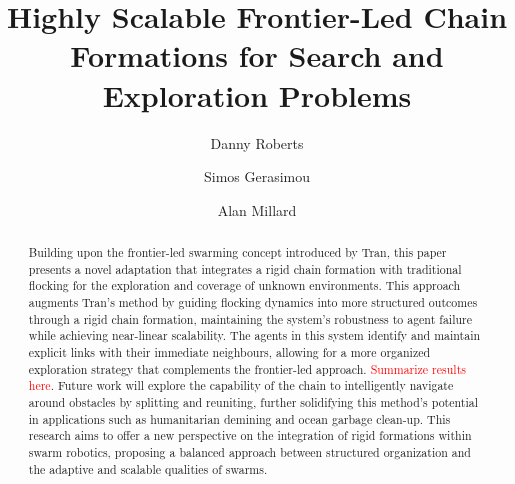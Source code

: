 \documentclass[runningheads]{llncs}
\newcommand\incomplete[1]{\textcolor{red}{#1}}
\begin{document}
%
\title{Highly Scalable Frontier-Led Chain Formations for Search and Exploration Problems}

\author{Danny Roberts \and
Simos Gerasimou \and
Alan Millard}


\maketitle 

\begin{abstract}
Building upon the frontier-led swarming concept introduced by Tran\cite{tran2022}, this paper presents a novel adaptation that integrates a rigid chain formation with traditional flocking for the exploration and coverage of unknown environments. This approach augments Tran's method by guiding flocking dynamics into more structured outcomes through a rigid chain formation, maintaining the system's robustness to agent failure while achieving near-linear scalability. The agents in this system identify and maintain explicit links with their immediate neighbours, allowing for a more organized exploration strategy that complements the frontier-led approach. \incomplete{Summarize results here}. Future work will explore the capability of the chain to intelligently navigate around obstacles by splitting and reuniting, further solidifying this method's potential in applications such as humanitarian demining and ocean garbage clean-up. This research aims to offer a new perspective on the integration of rigid formations within swarm robotics, proposing a balanced approach between structured organization and the adaptive and scalable qualities of swarms.


\end{abstract}
\end{document}
